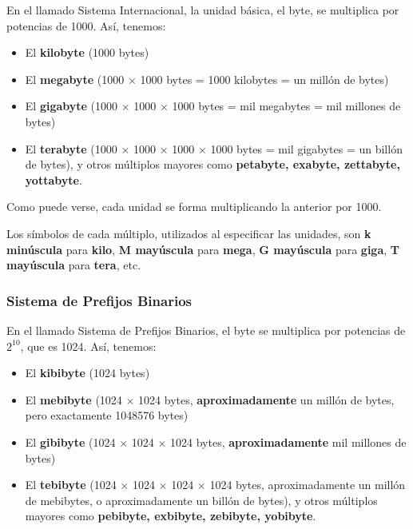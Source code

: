 \documentclass[spanish,A4,]{article}
\begin{document}
En el llamado Sistema Internacional, la unidad básica, el byte, se
multiplica por potencias de 1000. Así, tenemos:

\begin{itemize}
\itemsep1pt\parskip0pt
\item
  El \textbf{kilobyte} (1000 bytes)
\item
  El \textbf{megabyte} (1000 $\times$ 1000 bytes = 1000 kilobytes = un
  millón de bytes)
\item
  El \textbf{gigabyte} (1000 $\times$ 1000 $\times$ 1000 bytes = mil
  megabytes = mil millones de bytes)
\item
  El \textbf{terabyte} (1000 $\times$ 1000 $\times$ 1000 $\times$ 1000
  bytes = mil gigabytes = un billón de bytes), y otros múltiplos mayores
  como \textbf{petabyte, exabyte, zettabyte, yottabyte}.
\end{itemize}

Como puede verse, cada unidad se forma multiplicando la anterior por
1000.

Los símbolos de cada múltiplo, utilizados al especificar las unidades,
son \textbf{k minúscula} para \textbf{kilo}, \textbf{M mayúscula} para
\textbf{mega}, \textbf{G mayúscula} para \textbf{giga}, \textbf{T
mayúscula} para \textbf{tera}, etc.

\subsubsection{Sistema de Prefijos
Binarios}\label{sistema-de-prefijos-binarios}

En el llamado Sistema de Prefijos Binarios, el byte se multiplica por
potencias de $2^{10}$, que es 1024. Así, tenemos:

\begin{itemize}
\itemsep1pt\parskip0pt
\item
  El \textbf{kibibyte} (1024 bytes)
\item
  El \textbf{mebibyte} (1024 $\times$ 1024 bytes,
  \textbf{aproximadamente} un millón de bytes, pero exactamente 1048576
  bytes)
\item
  El \textbf{gibibyte} (1024 $\times$ 1024 $\times$ 1024 bytes,
  \textbf{aproximadamente} mil millones de bytes)
\item
  El \textbf{tebibyte} (1024 $\times$ 1024 $\times$ 1024 $\times$ 1024
  bytes, aproximadamente un millón de mebibytes, o aproximadamente un
  billón de bytes), y otros múltiplos mayores como \textbf{pebibyte,
  exbibyte, zebibyte, yobibyte}.
\end{itemize}
\end{document}
